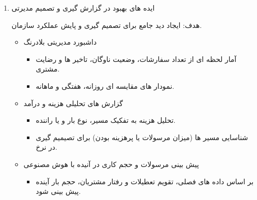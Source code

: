 \documentclass[12pt,a4paper]{report}
\begin{document}
\begin{enumerate}
هدف: افزایش رضایت مشتری، کاهش تماس های تکراری و تقویت وفاداری.
\begin{itemize}
	\item سیستم تکینگ هوشمند پشتیبانی 
	\begin{itemize}
		\item 
هر تماس یا شکایت مشتری به صورت خودکار ثبت و به واحد مروبطه ارجاع داده می شود.
		\item 
		پیامک اطلاع رسانی از وضعیت رسیدگی .
	\end{itemize}
	\item پروفایل مشتری و سابقه سفارشات
	\begin{itemize}
		\item 
کارمند بتواند تاریخچه کامل تعاملات را ببیند.
		\item
شناسایی مشتریان  برای سرویس سریع تر. 
	\end{itemize}
	\item سیستم امتیاز دهی رضایت از مشتری
	\begin{itemize}
		\item 
بعد از تحویل، لینک نظر خواهی ارسال شود.
		\item 
	تحلیل داده ها برای یافتن نقاط ضعف فرآیند.
	\end{itemize}
	\item باشگاه مشتریان وفادار
	\begin{itemize}
		\item 
ارائه تخفیف یا امتیاز برای مشتریانی که به صورت مکرر ارسال دارند.		
	\end{itemize}
\end{itemize}	
\item ایده های بهبود در گزارش گیری و تصمیم مدیرتی 

هدف: ایجاد دید جامع برای تصمیم گیری و پایش عملکرد سازمان.
		
\begin{itemize}
	\item 	داشبورد مدیریتی بلادرنگ
		\begin{itemize}
				\item 
آمار لحظه ای از تعداد سفارشات، وضعیت ناوگان، تاخیر ها و رضایت مشتری.
				\item 
نمودار های مقایسه ای روزانه، هفتگی  و ماهانه.
		\end{itemize}
			\item 	گزارش های تحلیلی هزینه و درآمد
		\begin{itemize}
			\item 
تحلیل هزینه به تفکیک مسیر، نوع بار و یا راننده.
			\item 
شناسایی مسیر ها (میزان مرسولات یا پرهزینه بودن) برای تصیمیم گیری در نرخ.
		\end{itemize}
			\item پیش بینی مرسولات و حجم کاری در آنیده با هوش مصنوعی
		\begin{itemize}
			\item 
بر اساس داده های فصلی، تقویم تعطیلات و رفتار مشتریان، حجم بار آینده پیش بینی شود.
		\end{itemize}
		

\end{itemize}
\end{enumerate}
\end{document}

